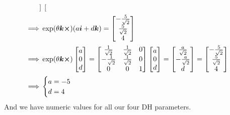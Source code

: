 \documentclass[a4paper]{scrartcl}
\begin{document}
\begin{equation}
\begin{aligned}
\begin{bmatrix}
        \end{bmatrix}\\
        \implies & \exp(\theta \bm{k}\cross)(a \bm{i} + d \bm{k}) = \begin{bmatrix}
            -\frac{5}{\sqrt{2}} \\ \frac{5}{\sqrt{2}} \\ 4
        \end{bmatrix}\\
        \implies &  \exp(\theta \bm{k}\cross) \begin{bmatrix}
            a \\ 0 \\ d
        \end{bmatrix} = 
        \begin{bmatrix}
            \frac{1}{\sqrt{2}} & \frac{1}{\sqrt{2}} & 0 \\
            -\frac{1}{\sqrt{2}} & \frac{1}{\sqrt{2}} & 0 \\
            0 & 0 & 1
        \end{bmatrix}
        \begin{bmatrix}
            a \\ 0 \\ d
        \end{bmatrix} = 
        \begin{bmatrix}
            \frac{a}{\sqrt{2}} \\ -\frac{a}{\sqrt{2}} \\ d
        \end{bmatrix} = 
        \begin{bmatrix}
            -\frac{5}{\sqrt{2}} \\ \frac{5}{\sqrt{2}} \\ 4
        \end{bmatrix}\\
        \implies & \begin{cases}
            a = -5\\
            d = 4
        \end{cases} 
    \end{aligned}
\end{equation}
And we have numeric values for all our four DH parameters.
\end{document}
